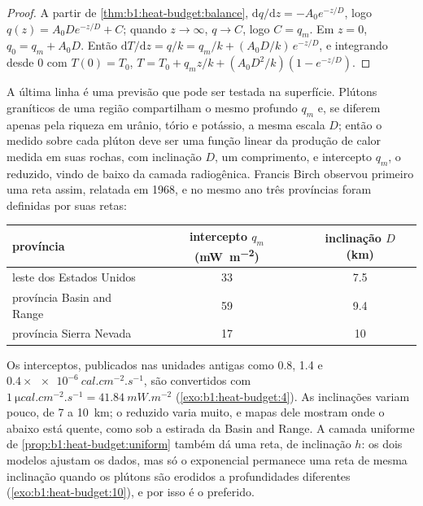 \begin{proof}
A partir de \cref{thm:b1:heat-budget:balance}, $\mathrm dq/\mathrm dz =
-A_0e^{-z/D}$, logo $q(z) = A_0 D e^{-z/D} + C$; quando $z \to \infty$, $q \to C$,
logo $C = q_m$. Em $z = 0$, $q_0 = q_m + A_0 D$. Então $\mathrm dT/\mathrm dz =
q/k = q_m/k + (A_0D/k)\,e^{-z/D}$, e integrando desde $0$ com $T(0) = T_0$,
$T = T_0 + q_m z/k + (A_0 D^2/k)(1 - e^{-z/D})$.
\end{proof}

A última linha é uma previsão que pode ser testada na superfície. Plútons graníticos de uma região compartilham o mesmo  profundo $q_m$ e, se diferem apenas pela riqueza em urânio, tório e potássio, a mesma escala $D$; então o  medido sobre cada plúton deve ser uma função linear da produção de calor medida em suas rochas, com inclinação $D$, um comprimento, e intercepto $q_m$, o  reduzido, vindo de baixo da camada radiogênica. Francis Birch observou primeiro uma reta assim, relatada em 1968, e no mesmo ano três províncias foram definidas por suas retas:
\begin{center}
\small
\begin{tabular}{lcc}
\hline
província & intercepto $q_m$ (\unit{mW.m^{-2}}) & inclinação $D$ (\unit{km}) \\
\hline
leste dos Estados Unidos & 33 & 7.5 \\
província Basin and Range & 59 & 9.4 \\
província Sierra Nevada & 17 & 10 \\
\hline
\end{tabular}
\end{center}
Os interceptos, publicados nas unidades antigas como 0.8, 1.4 e $0.4\times\qty{e-6}{cal.cm^{-2}.s^{-1}}$,
são convertidos com $\qty{1}{\micro cal.cm^{-2}.s^{-1}} = \qty{41.84}{mW.m^{-2}}$
(\cref{exo:b1:heat-budget:4}). As inclinações variam pouco, de 7 a \qty{10}{km}; o  reduzido
varia muito, e mapas dele mostram onde o  abaixo está quente, como sob
a  estirada da Basin and Range. A camada uniforme de
\cref{prop:b1:heat-budget:uniform} também dá uma reta, de inclinação $h$:
os dois modelos ajustam os dados, mas só o exponencial permanece uma reta
de mesma inclinação quando os plútons são erodidos a profundidades diferentes
(\cref{exo:b1:heat-budget:10}), e por isso é o preferido.


